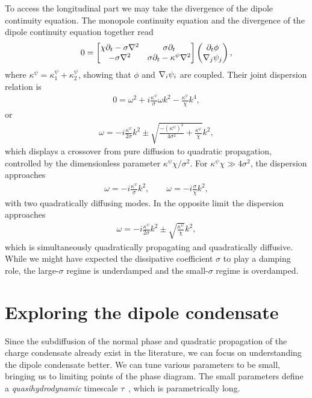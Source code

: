 To access the longitudinal part we may take the divergence of the dipole continuity equation. The monopole continuity equation and the divergence of the dipole continuity equation together read
\begin{align}
0 = 
\begin{bmatrix} \chi \partial_t - \sigma \nabla^2 & \sigma \partial_t  \\
-\sigma \nabla^2  & \sigma\partial_t - \kappa^\psi \nabla^2
\end{bmatrix} \begin{pmatrix} \partial_t \phi \\ \nabla_j\psi_j \end{pmatrix}, \label{eqn:dcmatrix}
\end{align}
where $\kappa^{\psi} = \kappa^\psi_1+ \kappa^\psi_2$, showing that $\phi$ and $\nabla_i\psi_i$ are coupled. Their joint dispersion relation is
\begin{align}
0 = \omega^2 + i\frac{\kappa^{\psi}}{\sigma} \omega k^2 - \frac{\kappa^{\psi}}{\chi}k^4, \label{eqn:DCdisp}
\end{align}
or
\begin{align}
\omega = -i\frac{\kappa^{\psi}}{2\sigma}k^2 \pm \sqrt{\frac{-(\kappa^{\psi})^2}{4\sigma^2} + \frac{\kappa^{\psi}}{\chi}}k^2,
\end{align}
which displays a crossover from pure diffusion to quadratic propagation, controlled by the dimensionless parameter $\kappa^{\psi}\chi/\sigma^2$. For $\kappa^{\psi}\chi \gg 4\sigma^2$, the dispersion approaches
\begin{align}
\omega = -i\frac{\kappa^{\psi}}{\sigma} k^2, \qquad \omega = -i \frac{\sigma}{\chi} k^2,
\end{align}
with two quadratically diffusing modes. In the opposite limit the dispersion approaches
\begin{align}
\omega = -i \frac{\kappa^{\psi}}{2\sigma} k^2 \pm \sqrt{\frac{\kappa^{\psi}}{\chi}} k^2,
\end{align}
which is simultaneously quadratically propagating and quadratically diffusive. While we might have expected the dissipative coefficient $\sigma$ to play a damping role, the large-$\sigma$ regime is underdamped and the small-$\sigma$ regime is overdamped.

\section{Exploring the dipole condensate}

Since the subdiffusion of the normal phase and quadratic propagation of the charge condensate already exist in the literature, we can focus on understanding the dipole condensate better. We can tune various parameters to be small, bringing us to limiting points of the phase diagram. The small parameters define a \emph{quasihydrodynamic} timescale $\tau$~\cite{Grozdanov2019QuasiHydro}, which is parametrically long.

